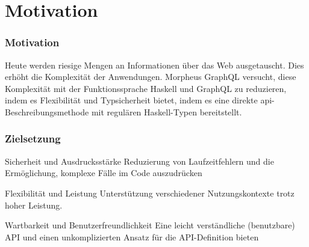 
\section{Motivation}

\begin{frame}{}
    \frametitle{Motivation}

    Heute werden riesige Mengen an Informationen über das Web ausgetauscht. Dies erhöht die Komplexität der Anwendungen. Morpheus GraphQL versucht, diese Komplexität mit der Funktionssprache Haskell und GraphQL zu reduzieren, indem es Flexibilität und Typsicherheit bietet, indem es eine direkte api-Beschreibungsmethode mit regulären Haskell-Typen bereitstellt. 

\end{frame}

\begin{frame}
    \frametitle{Zielsetzung}


        \footnotesize
        \begin{alertblock}{Sicherheit und Ausdrucksstärke}
            Reduzierung von Laufzeitfehlern und die Ermöglichung, komplexe Fälle im Code auszudrücken
        \end{alertblock}

        \begin{alertblock}{Flexibilität und Leistung} 
            Unterstützung verschiedener Nutzungskontexte trotz hoher Leistung. 
        \end{alertblock}

        \begin{alertblock}{Wartbarkeit und Benutzerfreundlichkeit} 
            Eine leicht verständliche (benutzbare) API und einen unkomplizierten Ansatz für die API-Definition bieten 
        \end{alertblock}
\end{frame}

